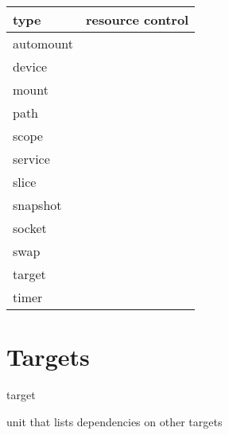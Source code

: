 \documentclass[openany, 12pt]{book}
\begin{document}
\begin{center}
	\begin{tabular}{lc}
		\toprule
		type      & resource control \\
		\midrule
		automount &                  \\
		device    &                  \\
		mount     &                  \\
		path      &                  \\
		scope     & \checkmark       \\
		service   & \checkmark       \\
		slice     & \checkmark       \\
		snapshot  &                  \\
		socket    &                  \\
		swap      &                  \\
		target    &                  \\
		timer     &                  \\
		\bottomrule
	\end{tabular}
\end{center}

\chapter{Targets}

\begin{definition}{target}{}
	\begin{alist}
		\item unit that lists dependencies on other targets
	\end{alist}
\end{definition}
\end{document}

